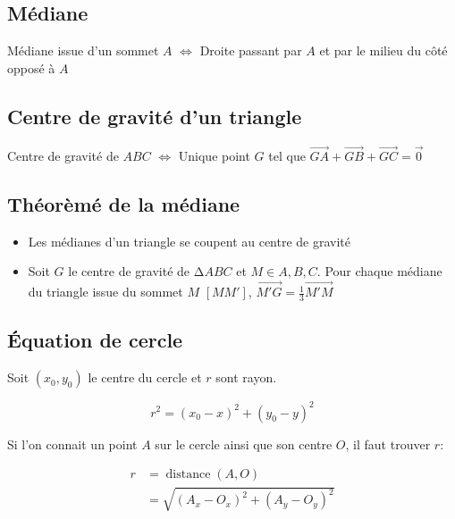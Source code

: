 \documentclass{article}
\newcommand{\vect}[1]{\overrightarrow{#1}}
\begin{document}
\subsection{Médiane}
Médiane issue d'un sommet $A$ $\iff$ Droite passant par $A$ et par le milieu du côté opposé à $A$

\subsection{Centre de gravité d'un triangle}
Centre de gravité de $ABC$ $\iff$ Unique point $G$ tel que $\vect{GA}+\vect{GB}+\vect{GC}=\vec 0$

\subsection{Théorèmé de la médiane}
\begin{itemize}
	\item Les médianes d'un triangle se coupent au centre de gravité
	\item Soit $G$ le centre de gravité de $\mathrm \Delta ABC$ et $M \in {A, B, C}$. Pour chaque médiane du triangle issue du sommet $M$ $[M M']$, $\vect{M'G} = \frac{1}{3}\vect{M'M}$
\end{itemize}

\subsection{Équation de cercle}
Soit $(x_0,y_0)$ le centre du cercle et $r$ sont rayon.

\[
	r^2 = (x_0-x)^2 + (y_0-y)^2
\] 

Si l'on connait un point $A$ sur le cercle ainsi que son centre $O$, il faut trouver $r$:

\begin{align*}
	r &= \operatorname{distance}(A, O) \\
	  &= \sqrt{(A_x - O_x)^2+(A_y - O_y)^2}  \\
\end{align*}

 
\end{document}
